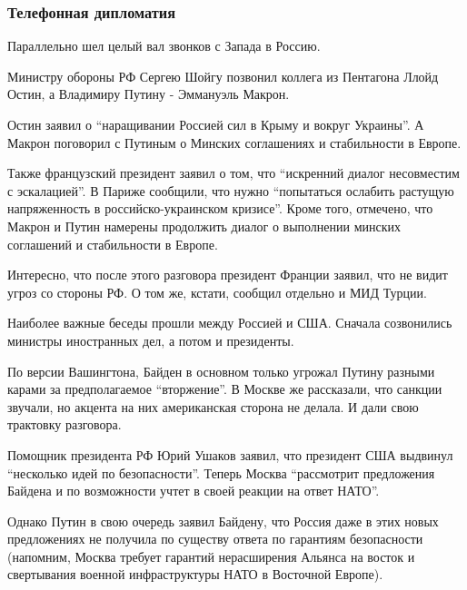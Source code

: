  
 
 
 
 

\subsubsection{Телефонная дипломатия}

Параллельно шел целый вал звонков с Запада в Россию. 

Министру обороны РФ Сергею Шойгу позвонил коллега из Пентагона Ллойд Остин, а
Владимиру Путину - Эммануэль Макрон.

Остин заявил о \enquote{наращивании Россией сил в Крыму и вокруг Украины}. А Макрон
поговорил с Путиным о Минских соглашениях и стабильности в Европе.

Также французский президент заявил о том, что \enquote{искренний диалог несовместим с
эскалацией}. В Париже сообщили, что нужно \enquote{попытаться ослабить растущую
напряженность в российско-украинском кризисе}. Кроме того, отмечено, что Макрон
и Путин намерены продолжить диалог о выполнении минских соглашений и
стабильности в Европе.

Интересно, что после этого разговора президент Франции заявил, что не видит
угроз со стороны РФ. О том же, кстати, сообщил отдельно и МИД Турции.

Наиболее важные беседы прошли между Россией и США. Сначала созвонились министры
иностранных дел, а потом и президенты. 

По версии Вашингтона, Байден в основном только угрожал Путину разными карами за
предполагаемое \enquote{вторжение}. В Москве же рассказали, что санкции звучали, но
акцента на них американская сторона не делала. И дали свою трактовку разговора.

Помощник президента РФ Юрий Ушаков заявил, что президент США выдвинул
\enquote{несколько идей по безопасности}. Теперь Москва \enquote{рассмотрит предложения Байдена
и по возможности учтет в своей реакции на ответ НАТО}.

Однако Путин в свою очередь заявил Байдену, что Россия даже в этих новых
предложениях не получила по существу ответа по гарантиям безопасности
(напомним, Москва требует гарантий нерасширения Альянса на восток и свертывания
военной инфраструктуры НАТО в Восточной Европе).


